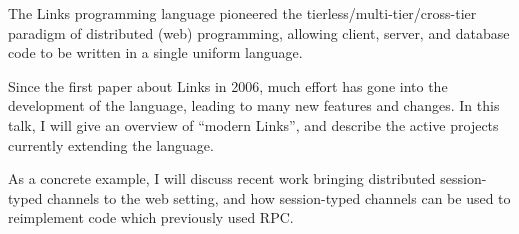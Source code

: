 The Links programming language pioneered the tierless/multi-tier/cross-tier paradigm of distributed (web) programming, allowing client, server, and database code to be written in a single uniform language.

Since the first paper about Links in 2006, much effort has gone into the development of the language, leading to many new features and changes. In this talk, I will give an overview of ``modern Links'', and describe the active projects currently extending the language.

As a concrete example, I will discuss recent work bringing distributed session-typed channels to the web setting, and how session-typed channels can be used to reimplement code which previously used RPC.
